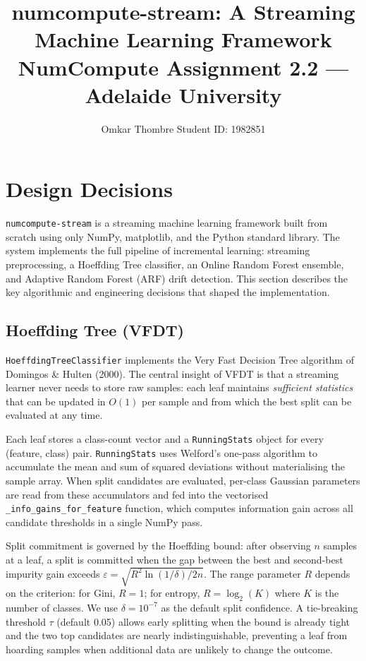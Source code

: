 \documentclass[10pt,a4paper]{article}
\title{\vspace{-3em}\textbf{numcompute-stream: A Streaming Machine Learning Framework}\\[0.3em]
\large NumCompute Assignment 2.2 --- Adelaide University}
\author{Omkar Thombre \quad Student ID: 1982851}
\date{}
\begin{document}
\maketitle
\vspace{-2.5em}

\section{Design Decisions}

\texttt{numcompute-stream} is a streaming machine learning framework built from scratch using only NumPy, matplotlib, and the Python standard library. The system implements the full pipeline of incremental learning: streaming preprocessing, a Hoeffding Tree classifier, an Online Random Forest ensemble, and Adaptive Random Forest (ARF) drift detection. This section describes the key algorithmic and engineering decisions that shaped the implementation.

\subsection{Hoeffding Tree (VFDT)}

\texttt{HoeffdingTreeClassifier} implements the Very Fast Decision Tree algorithm of Domingos \& Hulten (2000). The central insight of VFDT is that a streaming learner never needs to store raw samples: each leaf maintains \emph{sufficient statistics} that can be updated in $O(1)$ per sample and from which the best split can be evaluated at any time.

Each leaf stores a class-count vector and a \texttt{RunningStats} object for every (feature, class) pair. \texttt{RunningStats} uses Welford's one-pass algorithm to accumulate the mean and sum of squared deviations without materialising the sample array. When split candidates are evaluated, per-class Gaussian parameters are read from these accumulators and fed into the vectorised \texttt{\_info\_gains\_for\_feature} function, which computes information gain across all candidate thresholds in a single NumPy pass.

Split commitment is governed by the Hoeffding bound: after observing $n$ samples at a leaf, a split is committed when the gap between the best and second-best impurity gain exceeds $\varepsilon = \sqrt{R^2 \ln(1/\delta) / 2n}$. The range parameter $R$ depends on the criterion: for Gini, $R=1$; for entropy, $R = \log_2(K)$ where $K$ is the number of classes. We use $\delta = 10^{-7}$ as the default split confidence. A tie-breaking threshold $\tau$ (default 0.05) allows early splitting when the bound is already tight and the two top candidates are nearly indistinguishable, preventing a leaf from hoarding samples when additional data are unlikely to change the outcome.
\end{document}
